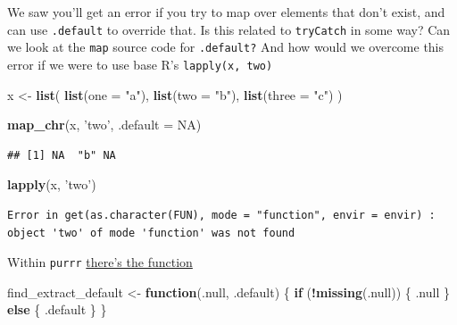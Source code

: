 \documentclass[]{book}
\newenvironment{Shaded}{\begin{snugshade}}{\end{snugshade}}
\newcommand{\ControlFlowTok}[1]{\textcolor[rgb]{0.13,0.29,0.53}{\textbf{#1}}}
\newcommand{\DataTypeTok}[1]{\textcolor[rgb]{0.13,0.29,0.53}{#1}}
\newcommand{\KeywordTok}[1]{\textcolor[rgb]{0.13,0.29,0.53}{\textbf{#1}}}
\newcommand{\NormalTok}[1]{#1}
\newcommand{\OperatorTok}[1]{\textcolor[rgb]{0.81,0.36,0.00}{\textbf{#1}}}
\newcommand{\OtherTok}[1]{\textcolor[rgb]{0.56,0.35,0.01}{#1}}
\newcommand{\StringTok}[1]{\textcolor[rgb]{0.31,0.60,0.02}{#1}}
\begin{document}
We saw you'll get an error if you try to map over elements that don't exist, and can use \texttt{.default} to override that. Is this related to \texttt{tryCatch} in some way? Can we look at the \texttt{map} source code for \texttt{.default?} And how would we overcome this error if we were to use base R's \texttt{lapply(x,\ \textquotesingle{}two\textquotesingle{})}

\begin{Shaded}
\begin{Highlighting}[]
\NormalTok{x <-}\StringTok{ }\KeywordTok{list}\NormalTok{(}
  \KeywordTok{list}\NormalTok{(}\DataTypeTok{one =} \StringTok{"a"}\NormalTok{),}
  \KeywordTok{list}\NormalTok{(}\DataTypeTok{two =} \StringTok{"b"}\NormalTok{),}
  \KeywordTok{list}\NormalTok{(}\DataTypeTok{three =} \StringTok{"c"}\NormalTok{)}
\NormalTok{)}

\KeywordTok{map_chr}\NormalTok{(x, }\StringTok{'two'}\NormalTok{, }\DataTypeTok{.default =} \OtherTok{NA}\NormalTok{)}
\end{Highlighting}
\end{Shaded}

\begin{verbatim}
## [1] NA  "b" NA
\end{verbatim}

\begin{Shaded}
\begin{Highlighting}[]
\KeywordTok{lapply}\NormalTok{(x, }\StringTok{'two'}\NormalTok{)}
\end{Highlighting}
\end{Shaded}

\begin{verbatim}
Error in get(as.character(FUN), mode = "function", envir = envir) : object 'two' of mode 'function' was not found
\end{verbatim}

Within \texttt{purrr} \href{https://github.com/tidyverse/purrr/blob/7104367bb6599f13e56c554bd07488b508a8a02b/R/as_mapper.R\#L98}{there's the function}

\begin{Shaded}
\begin{Highlighting}[]
\NormalTok{find_extract_default <-}\StringTok{ }\ControlFlowTok{function}\NormalTok{(.null, .default) \{}
  \ControlFlowTok{if}\NormalTok{ (}\OperatorTok{!}\KeywordTok{missing}\NormalTok{(.null)) \{}
\NormalTok{    .null}
\NormalTok{  \} }\ControlFlowTok{else}\NormalTok{ \{}
\NormalTok{    .default}
\NormalTok{  \}}
\NormalTok{\}}
\end{Highlighting}
\end{Shaded}
\end{document}

